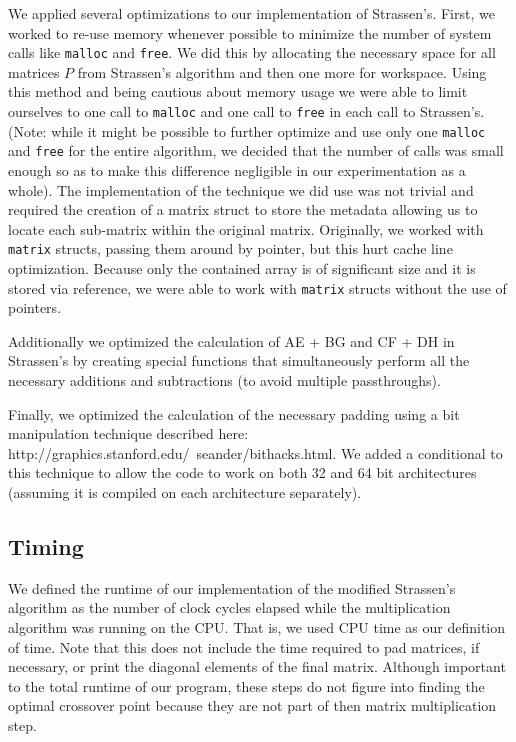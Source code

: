 \documentclass[solution, letterpaper]{cs121}
\begin{document}
We applied several optimizations to our implementation of Strassen's. First, we worked to re-use memory whenever possible to minimize the number of system calls like \texttt{malloc} and \texttt{free}. We did this by allocating the necessary space for all matrices $P$ from Strassen's algorithm and then one more for workspace. Using this method and being cautious about memory usage we were able to limit ourselves to one call to \texttt{malloc} and one call to \texttt{free} in each call to Strassen's. (Note: while it might be possible to further optimize and use only one \texttt{malloc} and \texttt{free} for the entire algorithm, we decided that the number of calls was small enough so as to make this difference negligible in our experimentation as a whole). The implementation of the technique we did use was not trivial and required the creation of a matrix struct to store the metadata allowing us to locate each sub-matrix within the original matrix. Originally, we worked with \texttt{matrix} structs, passing them around by pointer, but this hurt cache line optimization. Because only the contained array is of significant size and it is stored via reference, we were able to work with \texttt{matrix} structs without the use of pointers.

Additionally we optimized the calculation of AE + BG and CF + DH in Strassen's by creating special functions that simultaneously perform all the necessary additions and subtractions (to avoid multiple passthroughs).

Finally, we optimized the calculation of the necessary padding using a bit manipulation technique described here: http://graphics.stanford.edu/~seander/bithacks.html. We added a conditional to this technique to allow the code to work on both 32 and 64 bit architectures (assuming it is compiled on each architecture separately).

\subsection*{Timing}
We defined the runtime of our implementation of the modified Strassen's algorithm as the number of clock cycles elapsed while the multiplication algorithm was running on the CPU. That is, we used CPU time as our definition of time. Note that this does not include the time required to pad matrices, if necessary, or print the diagonal elements of the final matrix. Although important to the total runtime of our program, these steps do not figure into finding the optimal crossover point because they are not part of then matrix multiplication step.
\end{document}
